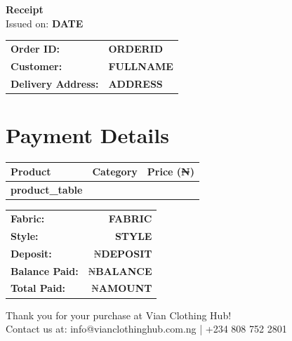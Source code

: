 \documentclass[a4paper,12pt]{article}
\begin{document}
\begin{center}
    \color{vianpurple}
    \textbf{\Large Receipt} \\
    \vspace{0.5cm}
    \color{black}
    \small Issued on: \textbf{DATE}
\end{center}

\vspace{1cm}

\begin{tabular}{ll}
    \textbf{Order ID:} & \textbf{ORDERID} \\
    \textbf{Customer:} & \textbf{FULLNAME} \\
    \textbf{Delivery Address:} & \textbf{ADDRESS} \\
\end{tabular}

\vspace{1cm}

\section*{Payment Details}
\begin{tabular}{p{6cm} p{4cm} r}
    \toprule
    \textbf{Product} & \textbf{Category} & \textbf{Price (₦)} \\
    \midrule
    \textbf{product_table}
    \bottomrule
\end{tabular}

\vspace{0.5cm}

\begin{tabular}{lr}
    \textbf{Fabric:} & \textbf{FABRIC} \\
    \textbf{Style:} & \textbf{STYLE} \\
    \textbf{Deposit:} & ₦\textbf{DEPOSIT} \\
    \textbf{Balance Paid:} & ₦\textbf{BALANCE} \\
    \midrule
    \textbf{Total Paid:} & ₦\textbf{AMOUNT} \\
\end{tabular}

\vspace{1cm}

\begin{center}
    \color{vianpurple}
    \small Thank you for your purchase at Vian Clothing Hub! \\
    \small Contact us at: info@vianclothinghub.com.ng | +234 808 752 2801
\end{center}
\end{document}
